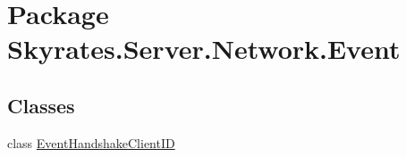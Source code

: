 \hypertarget{namespace_skyrates_1_1_server_1_1_network_1_1_event}{\section{Package Skyrates.\-Server.\-Network.\-Event}
\label{namespace_skyrates_1_1_server_1_1_network_1_1_event}
}
\subsection*{Classes}
\begin{DoxyCompactItemize}
\item 
class \hyperlink{class_skyrates_1_1_server_1_1_network_1_1_event_1_1_event_handshake_client_i_d}{Event\-Handshake\-Client\-I\-D}
\end{DoxyCompactItemize}
